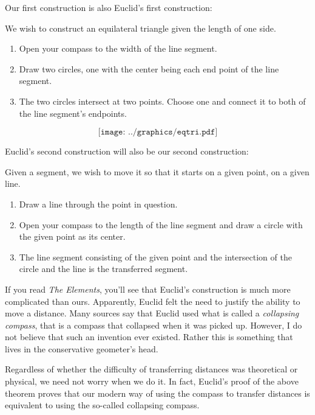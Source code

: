 Our first construction is also Euclid's first construction:

\begin{construction} We wish to construct an equilateral triangle given the length of one 
side.
\begin{enumerate} 
\item Open your compass to the width of the line segment.
\item Draw two circles, one with the center being each end point 
of the line segment.
\item The two circles intersect at two points.  Choose one and 
connect it to both of the line segment's endpoints.
\end{enumerate}
\[
\texttt{[image: ../graphics/eqtri.pdf]}
\]
\end{construction}

Euclid's second construction will also be our second construction:

\begin{construction}
Given a segment, we wish to move it so that it starts on a given
point, on a given line.
\begin{enumerate}        
\item Draw a line through the point in question.
\item Open your compass to the length of the line segment and draw a circle with the given point as its center.
\item The line segment consisting of the given point and the intersection of the circle and the line 
is the transferred segment.
\end{enumerate}
\end{construction}

If you read \emph{The Elements}, you'll see that Euclid's construction is
much more complicated than ours.   Apparently, Euclid felt the need to
justify the ability to move a distance. Many sources say that Euclid
used what is called a \textit{collapsing compass}, that is a compass that collapsed
when it was picked up. However, I do not believe that such an
invention ever existed. Rather this is something that lives in the
conservative geometer's head.


Regardless of whether the difficulty of transferring distances was theoretical
or physical, we need not worry when we do it.  In fact, Euclid's
proof of the above theorem proves that our modern way of using the
compass to transfer distances is equivalent to using the so-called
collapsing compass.

